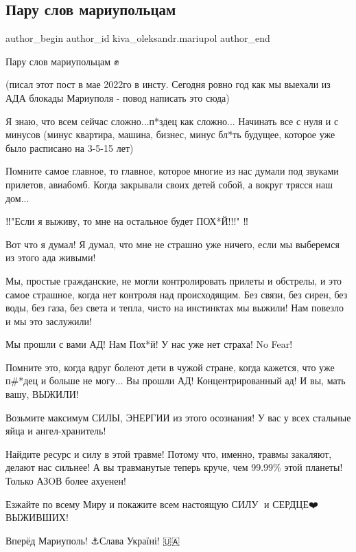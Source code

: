 
 
 
 
 

\subsection{Пару слов мариупольцам}
\label{sec:15_03_2023.fb.kiva_oleksandr.mariupol.1.paru_slov_mariupolcam}

\ifcmt
 author_begin
   author_id kiva_oleksandr.mariupol
 author_end
\fi

Пару слов мариупольцам ✊

(писал этот пост в мае 2022го в инсту. Сегодня ровно год как мы выехали из АДА
блокады Мариуполя  - повод написать это сюда) 

Я знаю, что всем сейчас сложно...п*здец как сложно... Начинать все с нуля и с
минусов (минус квартира, машина, бизнес, минус бл*ть будущее, которое уже было
расписано на 3-5-15 лет)

Помните самое главное, то главное, которое многие из нас думали под звуками
прилетов, авиабомб. Когда закрывали своих детей собой, а вокруг трясся наш
дом... 

‼️"Если я выживу, то мне на остальное будет ПОХ*Й!!!" ‼️

Вот что я думал! Я думал, что мне не страшно уже ничего, если мы выберемся из
этого ада живыми! 

Мы, простые гражданские, не могли контролировать прилеты и обстрелы, и это
самое страшное, когда нет контроля над происходящим. Без связи, без сирен, без
воды, без газа, без света и тепла, чисто на инстинктах мы выжили! Нам повезло и
мы это заслужили! 

Мы прошли с вами АД! Нам Пох*й! У нас уже нет страха! No Fear! 

Помните это, когда вдруг болеют дети в чужой стране, когда кажется, что уже
п\#*дец и больше не могу... Вы прошли АД! Концентрированный ад! И вы, мать вашу,
ВЫЖИЛИ! 

Возьмите максимум СИЛЫ, ЭНЕРГИИ из этого осознания! У вас у всех стальные яйца
и ангел-хранитель! 

Найдите ресурс и силу в этой травме! Потому что, именно, травмы закаляют,
делают нас сильнее! А вы травманутые теперь круче, чем 99.99\% этой планеты!
Только АЗOВ более ахуенен! 

Езжайте по всему Миру и покажите всем настоящую СИЛУ💪 и СЕРДЦЕ❤️ ВЫЖИВШИХ! 

Вперёд Мариуполь! ⚓Слава Україні! 🇺🇦

